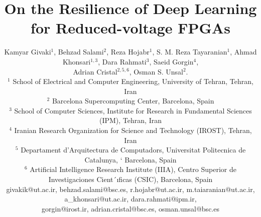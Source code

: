 \documentclass[conference]{IEEEtran}
\begin{document}
\title{On the Resilience of Deep Learning for Reduced-voltage FPGAs
}

\author{ \small Kamyar Givaki$^{1}$, Behzad Salami$^{2}$, Reza Hojabr$^{1}$,     S. M. Reza Tayaranian$^{1}$, Ahmad Khonsari$^{1,3}$, Dara Rahmati$^{3}$, Saeid Gorgin$^{4}$,\\ Adrian Cristal$^{2,5,6}$, Osman S. Unsal$^{2}$. \\ 
$^{1}$ School of Electrical and Computer Engineering, University of Tehran, Tehran, Iran\\
$^{2}$ Barcelona Supercomputing Center, Barcelona, Spain\\ 
$^{3}$ School of Computer Sciences, Institute for Research in Fundamental Sciences (IPM), Tehran, Iran\\
$^{4}$ Iranian Research Organization for Science and Technology (IROST), Tehran, Iran\\
$^{5}$ Departament d’Arquitectura de Computadors, Universitat Politecnica de Catalunya, `
Barcelona, Spain\\
$^{6}$ Artificial Intelligence Research Institute (IIIA), Centro Superior de Investigaciones
Cient´ıficas (CSIC), Barcelona, Spain\\



givakik@ut.ac.ir, behzad.salami@bsc.es, r.hojabr@ut.ac.ir, m.taiaranian@ut.ac.ir, a\_khonsari@ut.ac.ir, dara.rahmati@ipm.ir,\\ gorgin@irost.ir, adrian.cristal@bsc.es, osman.unsal@bsc.es



 }


\maketitle
\end{document}
